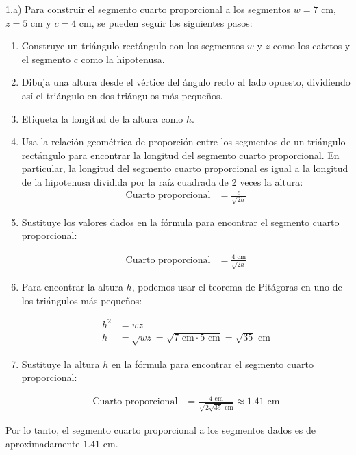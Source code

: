 \documentclass{article}
\begin{document}
{\Large 1.a)}
Para construir el segmento cuarto proporcional a los segmentos $w = 7$ cm, $z = 5$ cm y $c = 4$ cm, se pueden seguir los siguientes pasos:

\begin{enumerate}
\item Construye un triángulo rectángulo con los segmentos $w$ y $z$ como los catetos y el segmento $c$ como la hipotenusa.
\item Dibuja una altura desde el vértice del ángulo recto al lado opuesto, dividiendo así el triángulo en dos triángulos más pequeños.
\item Etiqueta la longitud de la altura como $h$.
\item Usa la relación geométrica de proporción entre los segmentos de un triángulo rectángulo para encontrar la longitud del segmento cuarto proporcional. En particular, la longitud del segmento cuarto proporcional es igual a la longitud de la hipotenusa dividida por la raíz cuadrada de 2 veces la altura:
\begin{align*}
    \text{Cuarto proporcional} &= \frac{c}{\sqrt{2h}}
\end{align*}

\item Sustituye los valores dados en la fórmula para encontrar el segmento cuarto proporcional:

\begin{align*}
    \text{Cuarto proporcional} &= \frac{4\text{ cm}}{\sqrt{2h}}
\end{align*}

\item Para encontrar la altura $h$, podemos usar el teorema de Pitágoras en uno de los triángulos más pequeños:

\begin{align*}
    h^2 &= wz \\
    h &= \sqrt{wz} = \sqrt{7\text{ cm} \cdot 5\text{ cm}} = \sqrt{35}\text{ cm}
\end{align*}

\item Sustituye la altura $h$ en la fórmula para encontrar el segmento cuarto proporcional:

\begin{align*}
    \text{Cuarto proporcional} &= \frac{4\text{ cm}}{\sqrt{2\sqrt{35}\text{ cm}}} \approx 1.41\text{ cm}
\end{align*}
\end{enumerate}

Por lo tanto, el segmento cuarto proporcional a los segmentos dados es de aproximadamente $1.41$ cm.
\end{document}
